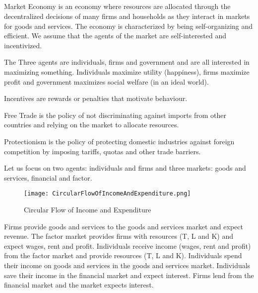 \subsection{}

\begin{definition}
    Market Economy is an economy where resources are allocated through the decentralized decisions of many firms and households as they interact in markets for goods and services.
    The economy is characterized by being self-organizing and efficient.
    We assume that the agents of the market are self-interested and incentivized.
\end{definition}

The Three agents are individuals, firms and government and are all interested in maximizing something.
Individuals maximize utility (happiness), firms maximize profit and government maximizes social welfare (in an ideal world).

\begin{definition}
    Incentives are rewards or penalties that motivate behaviour.
\end{definition}

\begin{definition}
    Free Trade is the policy of not discriminating against imports from other countries and relying on the market to allocate resources.
\end{definition}

\begin{definition}
    Protectionism is the policy of protecting domestic industries against foreign competition by imposing tariffs, quotas and other trade barriers.
\end{definition}

\begin{example}
    Let us focus on two agents: individuals and firms and three markets: goods and services, financial and factor.
    \begin{figure}[h!]
        \centering
        \texttt{[image: CircularFlowOfIncomeAndExpenditure.png]}
        \caption{Circular Flow of Income and Expenditure}
    \end{figure}
    Firms provide goods and services to the goods and services market and expect revenue.
    The factor market provides firms with resources (T, L and K) and expect wages, rent and profit.
    Individuals receive income (wages, rent and profit) from the factor market and provide resources (T, L and K).
    Individuals spend their income on goods and services in the goods and services market.
    Individuals save their income in the financial market and expect interest.
    Firms lend from the financial market and the market expects interest.

\end{example}
